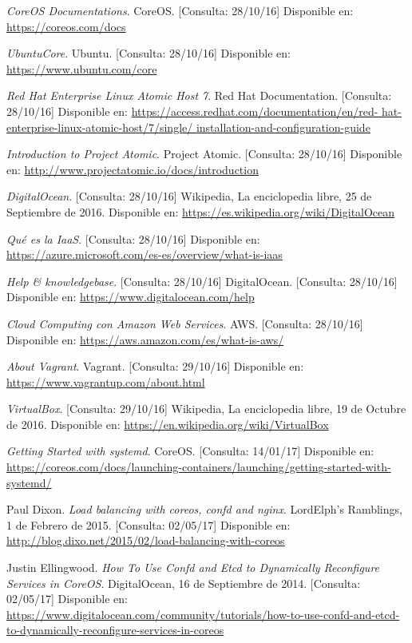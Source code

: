 \begin{thebibliography}{9}
\textit{CoreOS Documentations}. CoreOS. [Consulta: 28/10/16]
Disponible en: \url{https://coreos.com/docs}

\textit{UbuntuCore}. 
Ubuntu. [Consulta: 28/10/16]
Disponible en: \url{https://www.ubuntu.com/core}

\textit{Red Hat Enterprise Linux Atomic Host 7}. 
Red Hat Documentation. [Consulta: 28/10/16]
Disponible en: \url{https://access.redhat.com/documentation/en/red-
hat-enterprise-linux-atomic-host/7/single/
installation-and-configuration-guide}

\textit{Introduction to Project Atomic}. 
Project Atomic. [Consulta: 28/10/16]
Disponible en: \url{http://www.projectatomic.io/docs/introduction}

\textit{DigitalOcean}. [Consulta: 28/10/16]
Wikipedia, La enciclopedia libre, 25 de Septiembre de 2016.
Disponible en: \url{https://es.wikipedia.org/wiki/DigitalOcean}

\textit{Qué es la IaaS}. [Consulta: 28/10/16]
Disponible en: \url{https://azure.microsoft.com/es-es/overview/what-is-iaas}

\textit{Help \& knowledgebase}. [Consulta: 28/10/16]
DigitalOcean. [Consulta: 28/10/16]
Disponible en: \url{https://www.digitalocean.com/help}

\textit{Cloud Computing con Amazon Web Services}. 
AWS. [Consulta: 28/10/16]
Disponible en: \url{https://aws.amazon.com/es/what-is-aws/}

\textit{About Vagrant}. 
Vagrant. [Consulta: 29/10/16]
Disponible en: \url{https://www.vagrantup.com/about.html}

\textit{VirtualBox}. [Consulta: 29/10/16]
Wikipedia, La enciclopedia libre, 19 de Octubre de 2016.
Disponible en: \url{https://en.wikipedia.org/wiki/VirtualBox}

\textit{Getting Started with systemd}. 
CoreOS. [Consulta: 14/01/17]
Disponible en: \url{https://coreos.com/docs/launching-containers/launching/getting-started-with-systemd/}

Paul Dixon.
\textit{Load balancing with coreos, confd and nginx}. 
LordElph's Ramblings, 1 de Febrero de 2015. [Consulta: 02/05/17]
Disponible en: \url{http://blog.dixo.net/2015/02/load-balancing-with-coreos}

Justin Ellingwood.
\textit{How To Use Confd and Etcd to Dynamically Reconfigure Services in CoreOS}. 
DigitalOcean, 16 de Septiembre de 2014. [Consulta: 02/05/17]
Disponible en: \url{https://www.digitalocean.com/community/tutorials/how-to-use-confd-and-etcd-to-dynamically-reconfigure-services-in-coreos}


\end{thebibliography}
